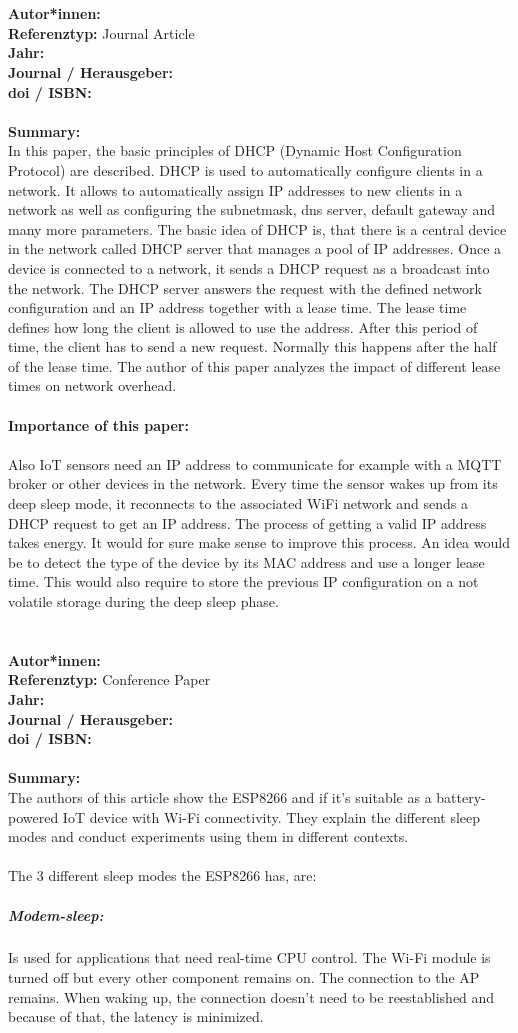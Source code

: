 \documentclass{report}
\newcommand{\createConferencePaperHeader}[1]{
    {\let\clearpage\relax \chapter{\citetitle{#1}}}
    \noindent
    \textbf{Autor*innen:} \citeauthor{#1} \\
    \textbf{Referenztyp:} Conference Paper\\
    \textbf{Jahr:} \citeyear{#1} \\
    \textbf{Journal / Herausgeber:} \citelist{#1}{publisher}\\
    \textbf{doi / ISBN:} \citefield{#1}{doi} \\\\
    \textbf{Summary:}\\
}
\newcommand{\createJournalArticleHeader}[1]{
    {\let\clearpage\relax \chapter{\citetitle{#1}}}
    \noindent
    \textbf{Autor*innen:} \citeauthor{#1} \\
    \textbf{Referenztyp:} Journal Article\\
    \textbf{Jahr:} \citeyear{#1} \\
    \textbf{Journal / Herausgeber:} \citefield{#1}{journaltitle}\\
    \textbf{doi / ISBN:} \citefield{#1}{doi} \\\\
    \textbf{Summary:}\\
}
\begin{document}

\createJournalArticleHeader{li_how_2018}
In this paper, the basic principles of DHCP (Dynamic Host Configuration Protocol) are described. 
DHCP is used to automatically configure clients in a network. 
It allows to automatically assign IP addresses to new clients in a network as well as configuring the subnetmask, dns server, default gateway and many more parameters.
The basic idea of DHCP is, that there is a central device in the network called DHCP server that manages a pool of IP addresses.
Once a device is connected to a network, it sends a DHCP request as a broadcast into the network. 
The DHCP server answers the request with the defined network configuration and an IP address together with a lease time.
The lease time defines how long the client is allowed to use the address. After this period of time, the client has to send a new request. 
Normally this happens after the half of the lease time.
The author of this paper analyzes the impact of different lease times on network overhead.
\\\\
\textbf{Importance of this paper:}
\\\\
Also IoT sensors need an IP address to communicate for example with a MQTT broker or other devices in the network.
Every time the sensor wakes up from its deep sleep mode, it reconnects to the associated WiFi network and sends a DHCP request to get an IP address.
The process of getting a valid IP address takes energy. It would for sure make sense to improve this process. 
An idea would be to detect the type of the device by its MAC address and use a longer lease time. This would also require to store the previous IP configuration on a not volatile storage during the deep sleep phase.


\createConferencePaperHeader{mesquita_assessing_2018}
The authors of this article show the ESP8266 and if it's suitable as a battery-powered IoT device with Wi-Fi connectivity.
They explain the different sleep modes and conduct experiments using them in different contexts.\\\\
The 3 different sleep modes the ESP8266 has, are:\\
\paragraph{Modem-sleep:} Is used for applications that need real-time CPU control. The Wi-Fi module is turned off but every other component remains on. The connection to the AP remains. When waking up, the connection doesn't need to be reestablished and because of that, the latency is minimized.
\end{document}
